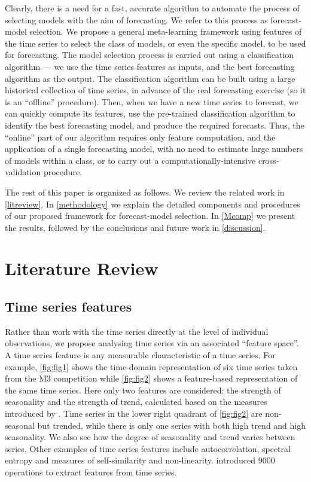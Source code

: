 \documentclass[11pt,a4paper,]{article}
\theoremstyle{definition}
\theoremstyle{definition}
\theoremstyle{definition}
\theoremstyle{remark}
\begin{document}
Clearly, there is a need for a fast, accurate algorithm to automate the
process of selecting models with the aim of forecasting. We refer to
this process as forecast-model selection. We propose a general
meta-learning framework using features of the time series to select the
class of models, or even the specific model, to be used for forecasting.
The model selection process is carried out using a classification
algorithm --- we use the time series features as inputs, and the best
forecasting algorithm as the output. The classification algorithm can be
built using a large historical collection of time series, in advance of
the real forecasting exercise (so it is an ``offline'' procedure). Then,
when we have a new time series to forecast, we can quickly compute its
features, use the pre-trained classification algorithm to identify the
best forecasting model, and produce the required forecasts. Thus, the
``online'' part of our algorithm requires only feature computation, and
the application of a single forecasting model, with no need to estimate
large numbers of models within a class, or to carry out a
computationally-intensive cross-validation procedure.

The rest of this paper is organized as follows. We review the related
work in \autoref{litreview}. In \autoref{methodology} we explain the
detailed components and procedures of our proposed framework for
forecast-model selection. In \autoref{Mcomp} we present the results,
followed by the conclusions and future work in \autoref{discussion}.

\section{Literature Review}\label{litreview}

\subsection{Time series features}\label{time-series-features}

Rather than work with the time series directly at the level of
individual observations, we propose analysing time series via an
associated ``feature space''. A time series feature is any measurable
characteristic of a time series. For example, \autoref{fig:fig1} shows
the time-domain representation of six time series taken from the M3
competition \autocite{makridakis2000m3} while \autoref{fig:fig2} shows a
feature-based representation of the same time series. Here only two
features are considered: the strength of seasonality and the strength of
trend, calculated based on the measures introduced by
\textcite{wang2009rule}. Time series in the lower right quadrant of
\autoref{fig:fig2} are non-seasonal but trended, while there is only one
series with both high trend and high seasonality. We also see how the
degree of seasonality and trend varies between series. Other examples of
time series features include autocorrelation, spectral entropy and
measures of self-similarity and non-linearity.
\textcite{fulcher2014highly} introduced 9000 operations to extract
features from time series.
\end{document}
